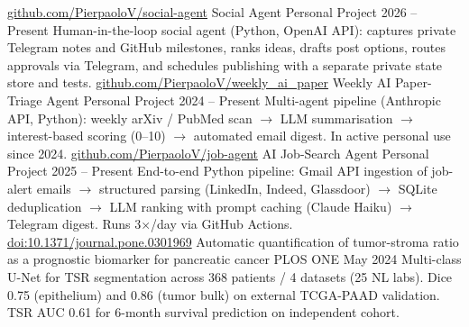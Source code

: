 


\begin{cventries}
    \cventry
        {\href{https://github.com/PierpaoloV/social-agent}{github.com/PierpaoloV/social-agent}}
        {Social Agent}
        {Personal Project}
        {2026 -- Present}
        {Human-in-the-loop social agent (Python, OpenAI API): captures private Telegram notes and GitHub milestones, ranks ideas, drafts post options, routes approvals via Telegram, and schedules publishing with a separate private state store and tests.}
    \vspace{1mm}
    \cventry
        {\href{https://github.com/PierpaoloV/weekly\_ai\_paper}{github.com/PierpaoloV/weekly\_ai\_paper}}
        {Weekly AI Paper-Triage Agent}
        {Personal Project}
        {2024 -- Present}
        {Multi-agent pipeline (Anthropic API, Python): weekly arXiv / PubMed scan $\rightarrow$ LLM summarisation $\rightarrow$ interest-based scoring (0--10) $\rightarrow$ automated email digest. In active personal use since 2024.}
    \vspace{1mm}
    \cventry
        {\href{https://github.com/PierpaoloV/job-agent}{github.com/PierpaoloV/job-agent}}
        {AI Job-Search Agent}
        {Personal Project}
        {2025 -- Present}
        {End-to-end Python pipeline: Gmail API ingestion of job-alert emails $\rightarrow$ structured parsing (LinkedIn, Indeed, Glassdoor) $\rightarrow$ SQLite deduplication $\rightarrow$ LLM ranking with prompt caching (Claude Haiku) $\rightarrow$ Telegram digest. Runs 3$\times$/day via GitHub Actions.}
    \vspace{1mm}
    \cventry
        {\href{https://journals.plos.org/plosone/article?id=10.1371/journal.pone.0301969}{doi:10.1371/journal.pone.0301969}}
        {Automatic quantification of tumor-stroma ratio as a prognostic biomarker for pancreatic cancer}
        {PLOS ONE}
        {May 2024}
        {Multi-class U-Net for TSR segmentation across 368 patients / 4 datasets (25 NL labs). Dice 0.75 (epithelium) and 0.86 (tumor bulk) on external TCGA-PAAD validation. TSR AUC 0.61 for 6-month survival prediction on independent cohort.}

\end{cventries}
